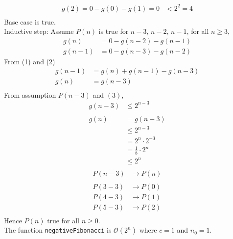 \begin{enumerate}
\begin{align*}
              g(2)=0-g(0)-g(1)=0 & <2^{2}=4 \\
          \end{align*}
          Base case is true.\\
          Inductive step: Assume $P(n)$ is true for $n-3$, $n-2$, $n-1$, for all $n\ge3$,
          \setcounter{equation}{0}
          \begin{align}
              g(n)   & =0-g(n-2)-g(n-1) \\
              g(n-1) & =0-g(n-3)-g(n-2)
          \end{align}
          From (1) and (2)
          \begin{align}
              g(n-1) & =g(n)+g(n-1)-g(n-3)\nonumber \\
              g(n)   & =g(n-3)                      \\\nonumber
          \end{align}
          From assumption $P(n-3)$ and $(3)$,
          \begin{align*}
              g(n-3) & \le2^{n-3}           \\~\\
              g(n)   & =g(n-3)              \\
                     & \le2^{n-3}           \\
                     & =2^n\cdot2^{-3}      \\
                     & =\frac{1}{8}\cdot2^n \\
                     & \le2^n               \\
          \end{align*}
          \begin{align*}
              P(n-3) & \longrightarrow P(n) \\~\\
              P(3-3) & \longrightarrow P(0) \\
              P(4-3) & \longrightarrow P(1) \\
              P(5-3) & \longrightarrow P(2) \\
          \end{align*}
          Hence $P(n)$ true for all $n\ge0$.\\
          The function \lstinline{negativeFibonacci} is $\mathcal{O}(2^n)$ where $c=1$ and $n_0=1$.
\end{enumerate}
\clearpage